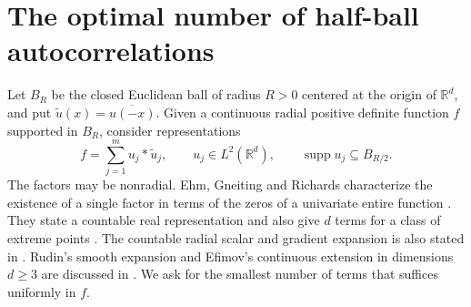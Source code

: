 \documentclass[11pt,a4paper]{article}
\numberwithin{equation}{section}
\begin{document}
\section{The optimal number of half-ball autocorrelations}
\label{sec:factor-rank}
Let $B_R$ be the closed Euclidean ball of radius $R>0$ centered at the origin of $\mathbb R^d$, and put $\widetilde u(x)=\overline{u(-x)}$. Given a continuous radial positive definite function $f$ supported in $B_R$, consider representations
\begin{equation}\label{eq:factor-rank}
 f=\sum_{j=1}^{m}u_j*\widetilde u_j,
 \qquad u_j\in L^2(\mathbb R^d),\qquad \operatorname{supp}u_j\subseteq B_{R/2}.
\end{equation}
The factors may be nonradial. Ehm, Gneiting and Richards characterize the existence of a single factor in terms of the zeros of a univariate entire function \cite[Theorems~2.1 and 3.1]{EGR}. They state a countable real representation and also give $d$ terms for a class of extreme points \cite[Theorems~3.8--3.9 and the ensuing discussion]{EGR}. The countable radial scalar and gradient expansion is also stated in \cite[eqs.~(39)--(40)]{EGR}. Rudin's smooth expansion and Efimov's continuous extension in dimensions $d\ge3$ are discussed in \cite[\S1 and Remark~7]{GM}. We ask for the smallest number of terms that suffices uniformly in $f$.
\end{document}
